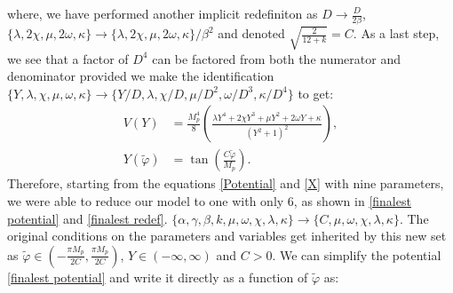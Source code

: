 \documentclass[aps,prd,reprint,preprintnumbers,showpacs,floatfix,nofootinbib,superscript address]{revtex4-2}
\begin{document}
where, we have performed another implicit redefiniton as $D \rightarrow \frac{D}{2\beta}$, $ \{\lambda, 2\chi, \mu, 2\omega,  \kappa \} \rightarrow \{\lambda, 2\chi, \mu, 2\omega,  \kappa \} /\beta^2$ and denoted $\sqrt{\frac{2}{12+k}} = C$. As a last step, we see that a factor of $D^4$ can be factored from both the numerator and denominator provided we make the identification $\{Y, \lambda, \chi, \mu, \omega, \kappa \} \rightarrow \{Y/D, \lambda, \chi/D, \mu/D^2, \omega/D^3, \kappa/D^4 \}$ to get:
\begin{align}
    V(Y) &=  \frac{M_p^4}{8}  \left(\frac{\lambda Y^4 + 2 \chi Y^3 + \mu Y^2  + 2\omega Y + \kappa}{(Y^2 + 1)^2} \right) ,\label{finalest potential} \\
    Y(\tilde{\varphi}) &=  \tan \left(\frac{C \tilde{\varphi}}{M_p} \right). \label{finalest redef}
\end{align}
Therefore, starting from the equations \cref{Potential} and \cref{X} with nine parameters, we were able to reduce our model to one with only 6, as shown in \cref{finalest potential} and \cref{finalest redef}. $\{\alpha, \gamma,\beta, k , \mu, \omega, \chi, \lambda, \kappa\} \rightarrow \{C , \mu, \omega, \chi, \lambda, \kappa\}$. The original conditions on the parameters and variables get inherited by this new set as $\tilde{\varphi} \in (-\frac{\pi M_p}{2C},\frac{\pi M_p}{2C})$, $Y \in (-\infty,\infty)$ and $C > 0$. We can simplify the potential \cref{finalest potential} and write it directly as a function of $\tilde{\varphi}$ as:
\end{document}
